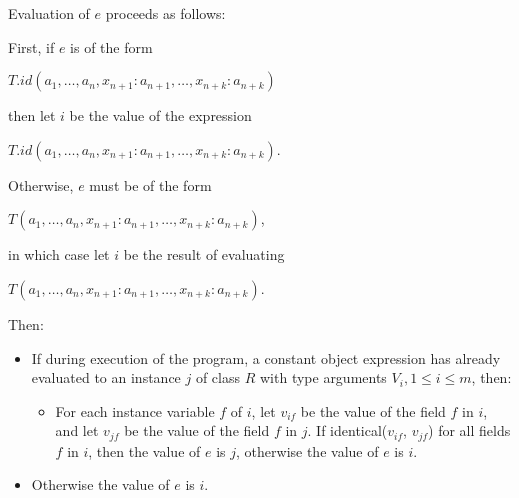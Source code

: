 \documentclass{article}
\newcommand{\code}[1]{{\sf #1}}
\begin{document}

\LMHash{}
Evaluation of $e$ proceeds as follows:

\LMHash{}
First, if $e$ is of the form 

\CONST{} $T.id(a_1, \ldots , a_n, x_{n+1}: a_{n+1}, \ldots , x_{n+k}: a_{n+k})$ 

then let $i$ be the value of the expression 

\NEW{} $T.id(a_1, \ldots , a_n, x_{n+1}: a_{n+1}, \ldots , x_{n+k}: a_{n+k})$. 

\LMHash{}
Otherwise, $e$ must be of the form  

\CONST{} $T(a_1, \ldots , a_n, x_{n+1}: a_{n+1}, \ldots , x_{n+k}: a_{n+k})$, 

in which case let $i$ be the result of evaluating 

\NEW{} $T(a_1, \ldots , a_n, x_{n+1}: a_{n+1}, \ldots , x_{n+k}: a_{n+k})$. 

\LMHash{}
Then:
\begin{itemize}
\item If during execution of the program, a constant object expression has already evaluated to an instance $j$ of class $R$ with type arguments $V_i, 1 \le i \le m$, then: 
\begin{itemize}
\item For each instance variable $f$ of $i$, let $v_{if}$ be the value of the field $f$ in $i$, and let $v_{jf}$ be the value of the field $f$ in $j$. If  \code{identical($v_{if}$, $v_{jf}$)} for all fields $f$ in $i$, then the value of $e$ is $j$, otherwise the value of $e$ is $i$.
\end{itemize}
\item Otherwise the value of $e$ is $i$.
\end{itemize}

\end{document}
